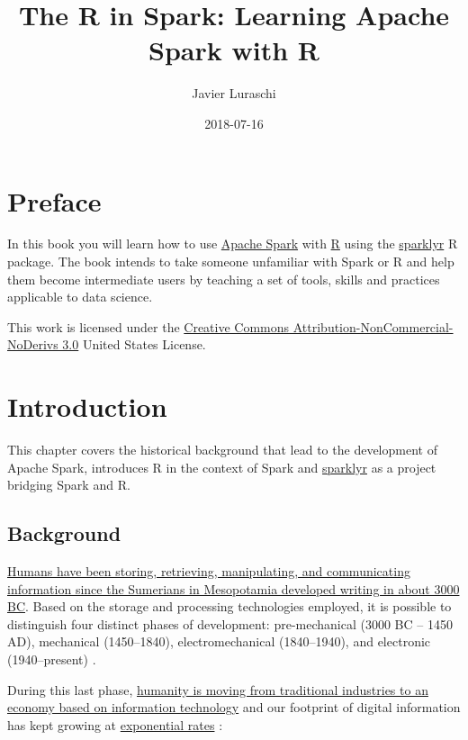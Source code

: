 \documentclass[]{book}
\title{The R in Spark: Learning Apache Spark with R}
\author{Javier Luraschi}
\date{2018-07-16}
\theoremstyle{definition}
\theoremstyle{definition}
\theoremstyle{definition}
\theoremstyle{remark}
\begin{document}
\maketitle

{
\setcounter{tocdepth}{1}
\tableofcontents
}
\hypertarget{preface}{%
\chapter*{Preface}\label{preface}}

In this book you will learn how to use
\href{https://spark.apache.org}{Apache Spark} with
\href{http://www.r-project.org/}{R} using the
\href{https://github.com/rstudio/sparklyr}{sparklyr} R package. The book
intends to take someone unfamiliar with Spark or R and help them become
intermediate users by teaching a set of tools, skills and practices
applicable to data science.

This work is licensed under the
\href{http://creativecommons.org/licenses/by-nc-nd/3.0/us/}{Creative
Commons Attribution-NonCommercial-NoDerivs 3.0} United States License.

\hypertarget{intro}{%
\chapter{Introduction}\label{intro}}

This chapter covers the historical background that lead to the
development of Apache Spark, introduces R in the context of Spark and
\href{https://github.com/rstudio/sparklyr}{sparklyr} as a project
bridging Spark and R.

\hypertarget{background}{%
\section{Background}\label{background}}

\href{https://en.wikipedia.org/wiki/Information_technology}{Humans have
been storing, retrieving, manipulating, and communicating information
since the Sumerians in Mesopotamia developed writing in about 3000 BC}.
Based on the storage and processing technologies employed, it is
possible to distinguish four distinct phases of development:
pre-mechanical (3000 BC -- 1450 AD), mechanical (1450--1840),
electromechanical (1840--1940), and electronic (1940--present)
\citep{information-technology}.

During this last phase,
\href{https://en.wikipedia.org/wiki/Information_Age}{humanity is moving
from traditional industries to an economy based on information
technology} and our footprint of digital information has kept growing at
\protect\hyperlink{storage-capacity}{exponential rates}
\citep{data-revolution}:
\end{document}
